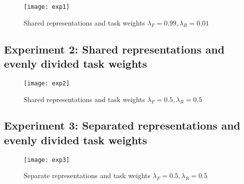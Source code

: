 \documentclass[]{article}
\begin{document}
	\begin{center} 
		\begin{figure}[H]
			\centering
			\texttt{[image: exp1]}
			\caption{Shared representations and task weights $\lambda_{F} = 0.99, \lambda_{R} = 0.01$}
		\end{figure}
	\end{center}

	\subsection{Experiment 2: Shared representations and evenly divided task weights}
	\begin{center} 
		\begin{figure}[H]
			\centering
			\texttt{[image: exp2]}
			\caption{Shared representations and task weights $\lambda_{F} = 0.5, \lambda_{R} = 0.5$}
		\end{figure}
	\end{center}

	\subsection{Experiment 3: Separated representations and evenly divided task weights}
	\begin{center} 
		\begin{figure}[H]
			\centering
			\texttt{[image: exp3]}
			\caption{Separate representations and task weights $\lambda_{F} = 0.5, \lambda_{R} = 0.5$}
		\end{figure}	
	\end{center}
	
\end{document}
